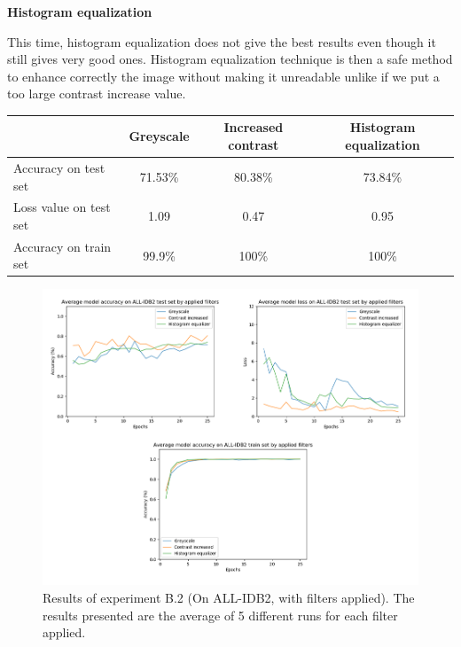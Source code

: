 \documentclass[11pt, openany]{report}
\theoremstyle{plain}
\theoremstyle{definition}
\theoremstyle{remark}
\begin{document}
\textbf{Histogram equalization}

This time, histogram equalization does not give the best results even though it still gives very good ones. Histogram equalization technique is then a safe method to enhance correctly the image without making it unreadable unlike if we put a too large contrast increase value.

\vspace{1cm}

\begin{center}
\begin{tabular}{|l|c|c|c|}
  \hline
   & \textbf{Greyscale} & \textbf{Increased contrast} & \textbf{Histogram equalization} \\
  \hline
  Accuracy on test set & 71.53\% & 80.38\% & 73.84\% \\
  Loss value on test set & 1.09 & 0.47 &  0.95\\ 
  Accuracy on train set & 99.9\% & 100\% & 100\% \\ 
  \hline
\end{tabular}
\label{table:results-B2}
\end{center}

\hspace*{0mm}\vfill
\begin{figure}[H]
  \centering
  \includegraphics[scale=0.5]{Code/ch6-LeukemiaSubtypes/figures_result/ALL_IDB2/all_idb2-filters.PNG}
  \caption{Results of experiment B.2 (On ALL-IDB2, with filters applied). The results presented are the average of 5 different runs for each filter applied.}
  \label{fig:results-B2}
\end{figure}
\vfill\hspace*{0mm}
\end{document}

